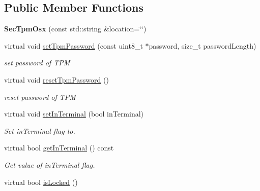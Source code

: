 \subsection*{Public Member Functions}
\begin{DoxyCompactItemize}
\item 
{\bfseries Sec\+Tpm\+Osx} (const std\+::string \&location=\char`\"{}\char`\"{})\hypertarget{classndn_1_1SecTpmOsx_ad449802fb47317b581f10b62b3437f53}{}\label{classndn_1_1SecTpmOsx_ad449802fb47317b581f10b62b3437f53}

\item 
virtual void \hyperlink{classndn_1_1SecTpmOsx_ad6c1f427deade6c18c0211550d8531ec}{set\+Tpm\+Password} (const uint8\+\_\+t $\ast$password, size\+\_\+t password\+Length)
\begin{DoxyCompactList}\small\item\em set password of T\+PM \end{DoxyCompactList}\item 
virtual void \hyperlink{classndn_1_1SecTpmOsx_ac4e3d755db66fbaee1ff85cbcb49fc5d}{reset\+Tpm\+Password} ()\hypertarget{classndn_1_1SecTpmOsx_ac4e3d755db66fbaee1ff85cbcb49fc5d}{}\label{classndn_1_1SecTpmOsx_ac4e3d755db66fbaee1ff85cbcb49fc5d}

\begin{DoxyCompactList}\small\item\em reset password of T\+PM \end{DoxyCompactList}\item 
virtual void \hyperlink{classndn_1_1SecTpmOsx_a0c368ec5fcbaa7fb127ac9513878f8a7}{set\+In\+Terminal} (bool in\+Terminal)
\begin{DoxyCompactList}\small\item\em Set in\+Terminal flag to. \end{DoxyCompactList}\item 
virtual bool \hyperlink{classndn_1_1SecTpmOsx_a41ba57c526dc4cd1a4f12ec965ec2109}{get\+In\+Terminal} () const\hypertarget{classndn_1_1SecTpmOsx_a41ba57c526dc4cd1a4f12ec965ec2109}{}\label{classndn_1_1SecTpmOsx_a41ba57c526dc4cd1a4f12ec965ec2109}

\begin{DoxyCompactList}\small\item\em Get value of in\+Terminal flag. \end{DoxyCompactList}\item 
virtual bool \hyperlink{classndn_1_1SecTpmOsx_ae016738a7a4ef512917a29aa4ec4ff90}{is\+Locked} ()\hypertarget{classndn_1_1SecTpmOsx_ae016738a7a4ef512917a29aa4ec4ff90}{}\label{classndn_1_1SecTpmOsx_ae016738a7a4ef512917a29aa4ec4ff90}


\end{DoxyCompactItemize}

